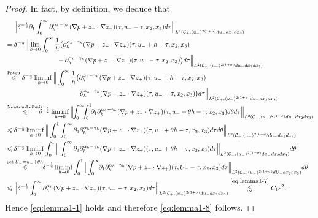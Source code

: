 \documentclass[10pt,reqno]{amsart}
\numberwithin{equation}{section}
\begin{document}
\begin{proof}
In fact, by definition, we  deduce that 
	\begin{align*}
	&\ \ \ \ \Big\|\delta^{-\frac{1}{2}}\partial_{1} \int_0^{\infty}\partial_h^{\alpha_h-\gamma_h}(\nabla p+z_{-}\cdot\nabla z_{+}) (\tau,u_--\tau,x_2,x_3)d\tau \Big\|_{L^2(\mathcal{C}_+,\langle u_{-}\rangle^{2(1+\sigma)}du_-dx_2dx_3)}\\
	&=\delta^{-\frac{1}{2}}\Big\|\lim_{h\to 0} \int_0^{\infty}\frac{1}{h}\big(\partial_h^{\alpha_h-\gamma_h}(\nabla p+z_{-}\cdot\nabla z_{+}) (\tau,u_-+h-\tau,x_2,x_3)\\
	&\ \ \ \ \ \ \ \ \ \ \ \ \ \ \ \ \ \ \ \ \ \ \ \  -\partial_h^{\alpha_h-\gamma_h}(\nabla p+z_{-}\cdot\nabla z_{+}) (\tau,u_--\tau,x_2,x_3)\big)
	d\tau \Big\|_{L^2(\mathcal{C}_+,\langle u_{-}\rangle^{2(1+\sigma)}du_-dx_2dx_3)}\\
	&\stackrel{\text{Fatou}}{\leqslant}\delta^{-\frac{1}{2}}\liminf_{h\to 0}\Big\| \int_0^{\infty}\frac{1}{h}\big(\partial_h^{\alpha_h-\gamma_h}(\nabla p+z_{-}\cdot\nabla z_{+}) (\tau,u_-+h-\tau,x_2,x_3)\\
	&\ \ \ \ \ \ \ \ \ \ \ \ \ \ \ \ \ \ \ \ \ \ \ \ \ \ \ \ \ \ \  -\partial_h^{\alpha_h-\gamma_h}(\nabla p+z_{-}\cdot\nabla z_{+}) (\tau,u_--\tau,x_2,x_3)\big)
	d\tau \Big\|_{L^2(\mathcal{C}_+,\langle u_{-}\rangle^{2(1+\sigma)}du_-dx_2dx_3)}\\
	&\stackrel{\text{Newton-Leibniz}}{\leqslant}\!\!\!\!\!\delta^{-\frac{1}{2}}\liminf_{h\to 0}\Big\|\!\! \int_0^{\infty}\!\!\!\int_0^1\!\!\partial_{1}\partial_h^{\alpha_h-\gamma_h}(\nabla p+z_{-}\cdot\nabla z_{+}) (\tau,u_-+\theta h-\tau,x_2,x_3)d\theta d\tau \Big\|_{L^2(\mathcal{C}_+,\langle u_{-}\rangle^{2(1+\sigma)}du_-dx_2dx_3)}\\
	&\leqslant\delta^{-\frac{1}{2}}\liminf_{h\to 0}\Big\|\int_0^1 \int_0^{\infty}\partial_{1}\partial_h^{\alpha_h-\gamma_h}(\nabla p+z_{-}\cdot\nabla z_{+}) (\tau,u_-+\theta h-\tau,x_2,x_3)d\tau d\theta  \Big\|_{L^2(\mathcal{C}_+,\langle u_{-}\rangle^{2(1+\sigma)}du_-dx_2dx_3)}\\
	&\leqslant\delta^{-\frac{1}{2}}\liminf_{h\to 0}\int_0^1\Big\| \int_0^{\infty}\partial_{1}\partial_h^{\alpha_h-\gamma_h}(\nabla p+z_{-}\cdot\nabla z_{+}) (\tau,u_-+\theta h-\tau,x_2,x_3)d\tau  \Big\|_{L^2(\mathcal{C}_+,\langle u_{-}\rangle^{2(1+\sigma)}du_-dx_2dx_3)}d\theta \\
	&\stackrel{\text{set }U_-=u_-+\theta h}{\leqslant}\!\!\delta^{-\frac{1}{2}}\liminf_{h\to 0}\int_0^1\Big\|\! \int_0^{\infty}\!\!\partial_{1}\partial_h^{\alpha_h-\gamma_h}(\nabla p+z_{-}\cdot\nabla z_{+}) (\tau,U_--\tau,x_2,x_3)d\tau  \Big\|_{L^2(\mathcal{C}_+,\langle u_{-}\rangle^{2(1+\sigma)}dU_-dx_2dx_3)}d\theta\\
	&\leqslant \Big\|\delta^{-\frac{1}{2}}\int_0^{\infty} \partial_h^{\alpha_h}(\nabla p+z_{-}\cdot\nabla z_{+}) 
	(\tau,u_--\tau,x_2,x_3)d\tau\Big\|_{L^2(\mathcal{C}_+,\langle u_-\rangle^{2(1+\sigma)}du_-dx_2dx_3)}
	\stackrel{\eqref{eq:lemma1-7}}{\lesssim} C_1\varepsilon^2.
	\end{align*}
 Hence \eqref{eq:lemma1-1} holds and therefore \eqref{eq:lemma1-8} follows.
 


\end{proof}
\end{document}
